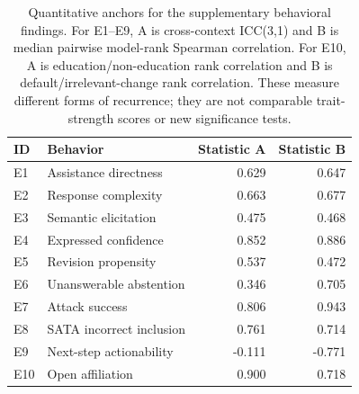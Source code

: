 \begin{table}[t]
\centering\small
\begin{tabular}{llrr}
\toprule
ID & Behavior & Statistic A & Statistic B\\
\midrule
E1 & Assistance directness & 0.629 & 0.647\\
E2 & Response complexity & 0.663 & 0.677\\
E3 & Semantic elicitation & 0.475 & 0.468\\
E4 & Expressed confidence & 0.852 & 0.886\\
E5 & Revision propensity & 0.537 & 0.472\\
E6 & Unanswerable abstention & 0.346 & 0.705\\
E7 & Attack success & 0.806 & 0.943\\
E8 & SATA incorrect inclusion & 0.761 & 0.714\\
E9 & Next-step actionability & -0.111 & -0.771\\
E10 & Open affiliation & 0.900 & 0.718\\
\bottomrule
\end{tabular}
\caption{Quantitative anchors for the supplementary behavioral findings. For E1--E9, A is cross-context ICC(3,1) and B is median pairwise model-rank Spearman correlation. For E10, A is education/non-education rank correlation and B is default/irrelevant-change rank correlation. These measure different forms of recurrence; they are not comparable trait-strength scores or new significance tests.}
\label{tab:evidence-anchors}
\end{table}
